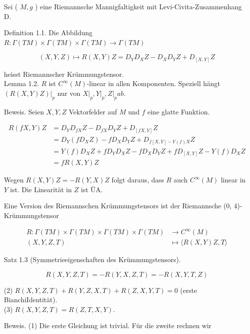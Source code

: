 \documentclass[10pt]{article}
\begin{document}
Sei ( $M, g$ ) eine Riemannsche Mannigfaltigkeit mit Levi-Civita-Zusammenhang D.

Definition 1.1. Die Abbildung\\
$R: \Gamma(T M) \times \Gamma(T M) \times \Gamma(T M) \rightarrow \Gamma(T M)$

$$
(X, Y, Z) \mapsto R(X, Y) Z=D_{Y} D_{X} Z-D_{X} D_{Y} Z+D_{[X, Y]} Z
$$

heisst Riemannscher Krümmungstensor.\\
Lemma 1.2. $R$ ist $C^{\infty}(M)$-linear in allen Komponenten. Speziell hängt $\left.(R(X, Y) Z)\right|_{p}$ nur von $\left.X\right|_{p},\left.Y\right|_{p},\left.Z\right|_{p} a b$.

Beweis. Seien $X, Y, Z$ Vektorfelder auf $M$ und $f$ eine glatte Funktion.

$$
\begin{aligned}
R(f X, Y) Z & =D_{Y} D_{f X} Z-D_{f X} D_{Y} Z+D_{[f X, Y]} Z \\
& =D_{Y}\left(f D_{X} Z\right)-f D_{X} D_{Y} Z+D_{f[X, Y]-Y(f) X} Z \\
& =Y(f) D_{X} Z+f D_{Y} D_{X} Z-f D_{X} D_{Y} Z+f D_{[X, Y]} Z-Y(f) D_{X} Z \\
& =f R(X, Y) Z
\end{aligned}
$$

Wegen $R(X, Y) Z=-R(Y, X) Z$ folgt daraus, dass $R$ auch $C^{\infty}(M)$ linear in $Y$ ist. Die Linearität in $Z$ ist ÜA.

Eine Version des Riemannschen Krümmungstensors ist der Riemannsche (0, 4)-Krümmungstensor

$$
\begin{aligned}
R: \Gamma(T M) \times \Gamma(T M) \times \Gamma(T M) \times \Gamma(T M) & \rightarrow C^{\infty}(M) \\
(X, Y, Z, T) & \mapsto\langle R(X, Y) Z, T\rangle
\end{aligned}
$$

Satz 1.3 (Symmetrieeigenschaften des Krümmungstensors).


\begin{equation*}
R(X, Y, Z, T)=-R(Y, X, Z, T)=-R(X, Y, T, Z) \tag{1}
\end{equation*}


(2) $R(X, Y, Z, T)+R(Y, Z, X, T)+R(Z, X, Y, T)=0$ (erste BianchiIdentität).\\
(3) $R(X, Y, Z, T)=R(Z, T, X, Y)$.

Beweis. (1) Die erste Gleichung ist trivial. Für die zweite rechnen wir
\end{document}
